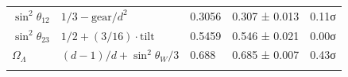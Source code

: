 \documentclass[12pt,a4paper]{article}
\begin{document}
\begin{longtable}[]{@{}lllll@{}}
\begin{minipage}[t]{0.13\columnwidth}\raggedright
\(\sin^2\theta_{12}\)\strut
\end{minipage} & \begin{minipage}[t]{0.25\columnwidth}\raggedright
\(1/3 - \text{gear}/d^2\)\strut
\end{minipage} & \begin{minipage}[t]{0.20\columnwidth}\raggedright
0.3056\strut
\end{minipage} & \begin{minipage}[t]{0.21\columnwidth}\raggedright
0.307 ± 0.013\strut
\end{minipage} & \begin{minipage}[t]{0.07\columnwidth}\raggedright
0.11σ\strut
\end{minipage}\tabularnewline
\begin{minipage}[t]{0.13\columnwidth}\raggedright
\(\sin^2\theta_{23}\)\strut
\end{minipage} & \begin{minipage}[t]{0.25\columnwidth}\raggedright
\(1/2 + (3/16)\cdot\text{tilt}\)\strut
\end{minipage} & \begin{minipage}[t]{0.20\columnwidth}\raggedright
0.5459\strut
\end{minipage} & \begin{minipage}[t]{0.21\columnwidth}\raggedright
0.546 ± 0.021\strut
\end{minipage} & \begin{minipage}[t]{0.07\columnwidth}\raggedright
0.00σ\strut
\end{minipage}\tabularnewline
\begin{minipage}[t]{0.13\columnwidth}\raggedright
\(\Omega_\Lambda\)\strut
\end{minipage} & \begin{minipage}[t]{0.25\columnwidth}\raggedright
\((d-1)/d + \sin^2\theta_W/3\)\strut
\end{minipage} & \begin{minipage}[t]{0.20\columnwidth}\raggedright
0.688\strut
\end{minipage} & \begin{minipage}[t]{0.21\columnwidth}\raggedright
0.685 ± 0.007\strut
\end{minipage} & \begin{minipage}[t]{0.07\columnwidth}\raggedright
0.43σ\strut
\end{minipage}\tabularnewline
\begin{minipage}[t]{0.13\columnwidth}\raggedright

\end{minipage}
\end{longtable}
\end{document}
